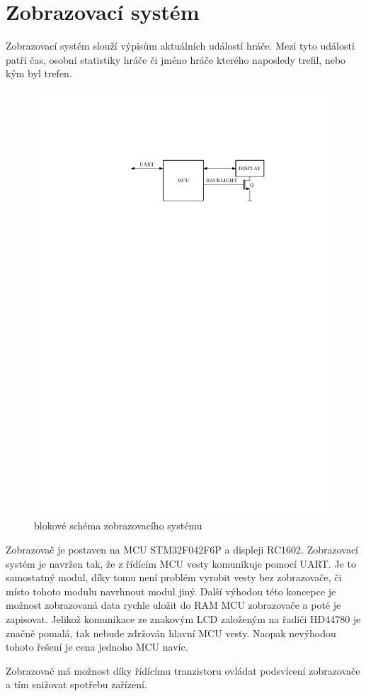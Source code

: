\chapter{Zobrazovací systém}

Zobrazovací systém slouží výpisům aktuálních událostí hráče. Mezi tyto události patří čas, osobní statistiky hráče či jméno hráče kterého naposledy trefil, nebo kým byl trefen.

\begin{figure}[H]
    \begin{center}
        \includegraphics[width=\textwidth]{img/display}
    \end{center}
    \caption{blokové schéma zobrazovacího systému}
\end{figure}

Zobrazovač je postaven na MCU STM32F042F6P a displeji RC1602. Zobrazovací systém je navržen tak, že z řídícím MCU vesty komunikuje pomocí UART. Je to samostatný modul, díky tomu není problém vyrobit vesty bez zobrazovače, či místo tohoto modulu navrhnout modul jiný. Další výhodou této koncepce je možnost zobrazovaná data rychle uložit do RAM MCU zobrazovače a poté je zapisovat. Jelikož komunikace ze znakovým LCD založeným na řadiči HD44780 je značně pomalá, tak nebude zdržován hlavní MCU vesty. Naopak nevýhodou tohoto řešení je cena jednoho MCU navíc.

Zobrazovač má možnost díky řídícímu tranzistoru ovládat podsvícení zobrazovače a tím snižovat spotřebu zařízení.
